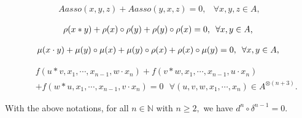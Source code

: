 \documentclass[10pt,a4paper]{amsart}
\begin{document}
			\begin{eqnarray}
				\label{6}
				Aasso(x,y,z)+Aasso(y,x,z)=0,& \forall x,y,z\in A,
			\end{eqnarray}

		\begin{eqnarray}
			\label{7}
			\rho(x\ast y)+\rho(x)\circ \rho(y)+\rho(y)\circ \rho(x)=0, \mbox{\,\ $\forall x,y\in A $, }
		\end{eqnarray}

		\begin{eqnarray}
			\label{8}
			\mu(x\cdot y)+\mu(y)\circ \mu(x)+\mu(y)\circ\rho(x)+\rho(x)\circ\mu(y)=0, \mbox{\,\ $\forall x,y\in A $, }
		\end{eqnarray}

	\begin{eqnarray}
		&& f(u\ast v, x_1,\cdots, x_{n-1}, w\cdot x_{n})+f(v\ast w, x_1,\cdots, x_{n-1}, u\cdot x_{n})\nonumber\\
		&&+f(w\ast u, x_1,\cdots, x_{n-1}, v\cdot x_{n})=0  \mbox{ $\forall (u,v,w, x_1,\cdots, x_n)\in A^{\otimes (n+3)}$.}\label{cA}
	\end{eqnarray}

	\begin{proposition}\label{Pro7}
		With the above notations,  for all $n\in\mathbb{N}$  with $n\geq 2,$ we have $d^n\circ \delta^{n-1}=0.$	
	\end{proposition}
\end{document}
